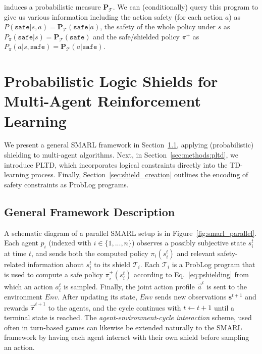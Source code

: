 \documentclass{ecai}
\theoremstyle{plain}
\theoremstyle{definition}
\theoremstyle{remark}
\begin{document}
induces a probabilistic measure $\mathbf{P}_\mathcal{T}$. We can (conditionally) query this program to give us various information including the action safety (for each action $a$) as $P(\texttt{safe}|s,a)=\mathbf{P}_\mathcal{T}(\texttt{safe}|a)$, the safety of the whole policy under $s$ as $P_\pi(\texttt{safe}|s)=\mathbf{P}_\mathcal{T}(\texttt{safe})$ and the safe/shielded policy $\pi^+$ as $P_\pi(a|s,\texttt{safe})=\mathbf{P}_\mathcal{T}(a|\texttt{safe})$.




\section{Probabilistic Logic Shields for Multi-Agent Reinforcement Learning}

We present a general SMARL framework in Section~\ref{sec:methods:smarl}, applying (probabilistic) shielding to multi-agent algorithms. Next, in Section~\ref{sec:methods:pltd}, we introduce PLTD, which incorporates logical constraints directly into the TD-learning process. Finally, Section~\ref{sec:shield_creation} outlines the encoding of safety constraints as ProbLog programs.

\subsection{General Framework Description}
\label{sec:methods:smarl}
 A schematic diagram of a parallel SMARL setup is in Figure~\ref{fig:smarl_parallel}. Each agent $p_i$ (indexed with $i\in\{1,...,n\}$) observes a possibly subjective state $s_i^t$ at time $t$, and sends both the computed policy $\pi_i(s^t_i)$ and relevant safety-related information about $s_i^t$ to its shield $\mathcal{T}_i$. Each $\mathcal{T}_i$ is a ProbLog program that is used to compute a safe policy $\pi_i^+(s_i^t)$ according to Eq.~\ref{eq:pshielding} from which an action $a_i^t$ is sampled. Finally, the joint action profile $\vec{a}^t$ is sent to the environment $Env$. After updating its state, $Env$ sends new observations $\mathbf{s}^{t+1}$ and rewards $\vec{\mathbf{r}}^{t+1}$ to the agents, and the cycle continues with $t\leftarrow t+1$ until a terminal state is reached. The \textit{agent-environment-cycle interaction} scheme, used often in turn-based games \citep{terry2021pettingzoo} can likewise be extended naturally to the SMARL framework by having each agent interact with their own shield before sampling an action.
\end{document}
